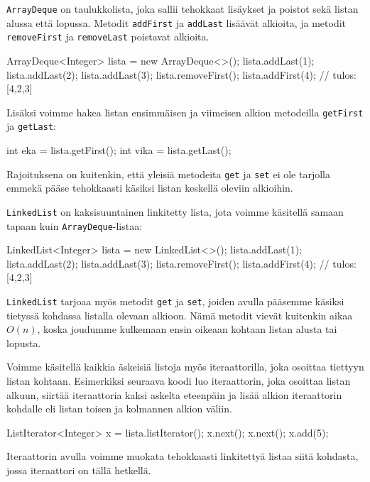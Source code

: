 \texttt{ArrayDeque} on taulukkolista,
joka sallii tehokkaat lisäykset ja poistot
sekä listan alussa että lopussa.
Metodit \texttt{addFirst} ja \texttt{addLast}
lisäävät alkioita,
ja metodit \texttt{removeFirst} ja \texttt{removeLast}
poistavat alkioita.

\begin{code}
ArrayDeque<Integer> lista = new ArrayDeque<>();
lista.addLast(1);
lista.addLast(2);
lista.addLast(3);
lista.removeFirst();
lista.addFirst(4);
// tulos: [4,2,3]
\end{code}

Lisäksi voimme hakea listan ensimmäisen ja viimeisen alkion
metodeilla \texttt{getFirst} ja \texttt{getLast}:

\begin{code}
int eka = lista.getFirst();
int vika = lista.getLast();
\end{code}

Rajoituksena on kuitenkin, että yleisiä metodeita
\texttt{get} ja \texttt{set} ei ole tarjolla
emmekä pääse tehokkaasti käsiksi listan keskellä
oleviin alkioihin.

\texttt{LinkedList} on kaksisuuntainen linkitetty lista,
jota voimme käsitellä samaan tapaan kuin \texttt{ArrayDeque}-listaa:

\begin{code}
LinkedList<Integer> lista = new LinkedList<>();
lista.addLast(1);
lista.addLast(2);
lista.addLast(3);
lista.removeFirst();
lista.addFirst(4);
// tulos: [4,2,3]
\end{code}

\texttt{LinkedList} tarjoaa myös metodit
\texttt{get} ja \texttt{set}, joiden avulla
pääsemme käsiksi tietyssä kohdassa listalla olevaan alkioon.
Nämä metodit vievät kuitenkin aikaa $O(n)$,
koska joudumme kulkemaan ensin oikeaan kohtaan listan
alusta tai lopusta.


Voimme käsitellä kaikkia äskeisiä listoja myös iteraattorilla,
joka osoittaa tiettyyn listan kohtaan.
Esimerkiksi seuraava koodi luo iteraattorin,
joka osoittaa listan alkuun,
siirtää iteraattoria kaksi askelta eteenpäin ja
lisää alkion iteraattorin kohdalle eli listan
toisen ja kolmannen alkion väliin.

\begin{code}
ListIterator<Integer> x = lista.listIterator();
x.next();
x.next();
x.add(5);
\end{code}

Iteraattorin avulla voimme muokata tehokkaasti
linkitettyä listaa siitä kohdasta,
jossa iteraattori on tällä hetkellä.

